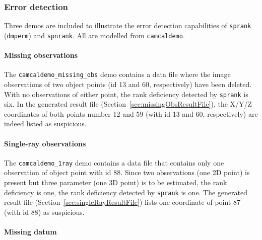\documentclass{article}
\begin{document}
\subsubsection{Error detection}
\label{sec:orge8a4420}

Three demos are included to illustrate the error detection
capabilities of \texttt{sprank} (\texttt{dmperm}) and
\texttt{spnrank}. All are modelled from \texttt{camcaldemo}.

\paragraph{Missing observations}
\label{sec:org04ec03a}

The \texttt{camcaldemo\_missing\_obs} demo contains a data file where the image
observations of two object points (id 13 and 60, respectively) have
been deleted. With no observations of either point, the rank
deficiency detected by \texttt{sprank} is six. In the generated result file
(Section~\ref{sec:missingObsResultFile}), the X/Y/Z coordinates
of both points number 12 and 59 (with id 13 and 60, respectively) are
indeed listed as suspicious.

\paragraph{Single-ray observations}
\label{sec:org7a94913}

The \texttt{camcaldemo\_1ray} demo contains a data file that contains
only one observation of object point with id 88. Since two
observations (one 2D point) is present but three parameter (one 3D
point) is to be estimated, the rank deficiency is one, the rank
deficiency detected by \texttt{sprank} is one. The generated result
file (Section~\ref{sec:singleRayResultFile}) lists one coordinate of
point 87 (with id 88) as suspicious.

\paragraph{Missing datum}
\label{sec:orgd7c8867}
\end{document}
